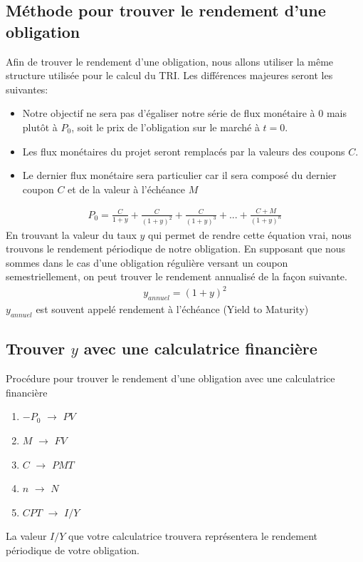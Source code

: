 \documentclass[letterpaper, 12pt]{article}
\newcommand{\1}{\mathds{1}}	%
\theoremstyle{definition}
\begin{document}
\subsection{Méthode pour trouver le rendement d'une obligation}
Afin de trouver le rendement d'une obligation, nous allons utiliser la même structure utilisée pour le calcul du TRI. Les différences majeures seront les suivantes:
\begin{itemize}
\item Notre objectif ne sera pas d'égaliser notre série de flux monétaire à 0 mais plutôt à $P_0$, soit le prix de l'obligation sur le marché à $t=0$. 
\item Les flux monétaires du projet seront remplacés par la valeurs des coupons $C$.
\item Le dernier flux monétaire sera particulier car il sera composé du dernier coupon $C$ et de la valeur à l'échéance $M$
\end{itemize}
\begin{align*}
P_0=\frac{C}{1+y}+\frac{C}{(1+y)^2}+\frac{C}{(1+y)^3}+...+\frac{C+M}{(1+y)^n}
\end{align*}
En trouvant la valeur du taux $y$ qui permet de rendre cette équation vrai, nous trouvons le rendement périodique de notre obligation. En supposant que nous sommes dans le cas d'une obligation régulière versant un coupon semestriellement, on peut trouver le rendement annualisé de la façon suivante.
\begin{align*}
y_{annuel}=(1+y)^2
\end{align*}
$y_{annuel}$ est souvent appelé rendement à l'échéance (Yield to Maturity)
\subsection{Trouver $y$ avec une calculatrice financière}
Procédure pour trouver le rendement d'une obligation avec une calculatrice financière
\begin{enumerate}
\item $-P_0$ $\rightarrow$ $PV$
\item $M$ $\rightarrow$ $FV$
\item $C$ $\rightarrow$ $PMT$
\item $n$ $\rightarrow$ $N$
\item $CPT$ $\rightarrow$ $I/Y$
\end{enumerate}
La valeur $I/Y$ que votre calculatrice trouvera représentera le rendement périodique de votre obligation. 

\newpage
\end{document}
